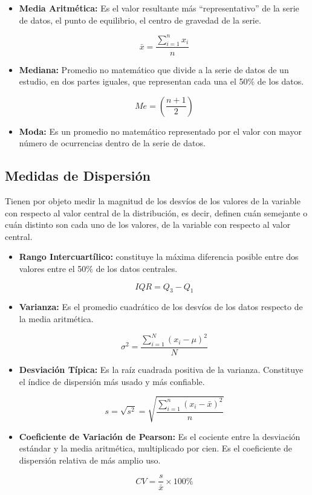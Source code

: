 \documentclass[oneside,11pt]{Latex/Classes/PhDthesisPSnPDF}
\begin{document}
\begin{itemize}
\item{\textbf{Media Aritmética:} Es el valor resultante más “representativo” de la serie de datos, el punto de equilibrio, el centro de gravedad de la serie.}

$$\bar{x} = \frac{\sum_{i=1}^{n} x_i}{n}$$

\item{\textbf{Mediana:} Promedio no matemático que divide a la serie de datos de un estudio, en dos partes iguales, que representan cada una el 50\% de los datos.}

 $$Me = \left(\frac{n+1}{2}\right)$$

\item{\textbf{Moda:} Es un promedio no matemático representado por el valor con mayor número de ocurrencias dentro de la serie de datos.}
\end{itemize}

\hfill\break

\subsection*{Medidas de Dispersión}

Tienen por objeto medir la magnitud de los desvíos de los valores de la
variable con respecto al valor central de la distribución, es decir,
definen cuán semejante o cuán distinto son cada uno de los valores, de
la variable con respecto al valor central.

\begin{itemize}
\item{\textbf{Rango Intercuartílico:} constituye la máxima diferencia posible entre dos valores entre el 50\% de los datos centrales.}

$$IQR = Q_3 - Q_1$$

\item{\textbf{Varianza:} Es el promedio cuadrático de los desvíos de los datos respecto de la media aritmética.}

$$\sigma^2 = \frac{\sum_{i=1}^{N} (x_i - \mu)^2}{N}$$

\item{\textbf{Desviación Típica:} Es la raíz cuadrada positiva de la varianza. Constituye el índice de dispersión más usado y más confiable.}

$$s = \sqrt{s^2} = \sqrt{\frac{\sum_{i=1}^{n} (x_i - \bar{x})^2}{n}}$$

\item{\textbf{Coeficiente de Variación de Pearson:} Es el cociente entre la desviación estándar y la media aritmética, multiplicado por cien. Es el coeficiente de dispersión relativa de más amplio uso.}

$$CV =  \frac{s}{\bar{x}} \times 100\%$$
\end{itemize}
\end{document}
